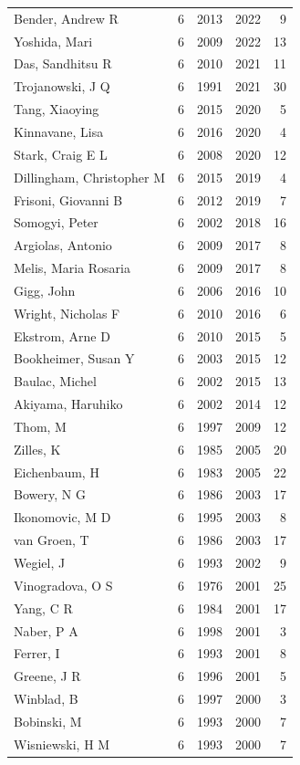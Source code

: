 \documentclass{../latex/analysis_report}
\begin{document}
\begin{longtable}{lrrrr}
Bender, Andrew R & 6 & 2013 & 2022 & 9 \\
Yoshida, Mari & 6 & 2009 & 2022 & 13 \\
Das, Sandhitsu R & 6 & 2010 & 2021 & 11 \\
Trojanowski, J Q & 6 & 1991 & 2021 & 30 \\
Tang, Xiaoying & 6 & 2015 & 2020 & 5 \\
Kinnavane, Lisa & 6 & 2016 & 2020 & 4 \\
Stark, Craig E L & 6 & 2008 & 2020 & 12 \\
Dillingham, Christopher M & 6 & 2015 & 2019 & 4 \\
Frisoni, Giovanni B & 6 & 2012 & 2019 & 7 \\
Somogyi, Peter & 6 & 2002 & 2018 & 16 \\
Argiolas, Antonio & 6 & 2009 & 2017 & 8 \\
Melis, Maria Rosaria & 6 & 2009 & 2017 & 8 \\
Gigg, John & 6 & 2006 & 2016 & 10 \\
Wright, Nicholas F & 6 & 2010 & 2016 & 6 \\
Ekstrom, Arne D & 6 & 2010 & 2015 & 5 \\
Bookheimer, Susan Y & 6 & 2003 & 2015 & 12 \\
Baulac, Michel & 6 & 2002 & 2015 & 13 \\
Akiyama, Haruhiko & 6 & 2002 & 2014 & 12 \\
Thom, M & 6 & 1997 & 2009 & 12 \\
Zilles, K & 6 & 1985 & 2005 & 20 \\
Eichenbaum, H & 6 & 1983 & 2005 & 22 \\
Bowery, N G & 6 & 1986 & 2003 & 17 \\
Ikonomovic, M D & 6 & 1995 & 2003 & 8 \\
van Groen, T & 6 & 1986 & 2003 & 17 \\
Wegiel, J & 6 & 1993 & 2002 & 9 \\
Vinogradova, O S & 6 & 1976 & 2001 & 25 \\
Yang, C R & 6 & 1984 & 2001 & 17 \\
Naber, P A & 6 & 1998 & 2001 & 3 \\
Ferrer, I & 6 & 1993 & 2001 & 8 \\
Greene, J R & 6 & 1996 & 2001 & 5 \\
Winblad, B & 6 & 1997 & 2000 & 3 \\
Bobinski, M & 6 & 1993 & 2000 & 7 \\
Wisniewski, H M & 6 & 1993 & 2000 & 7 \\

\end{longtable}
\end{document}
